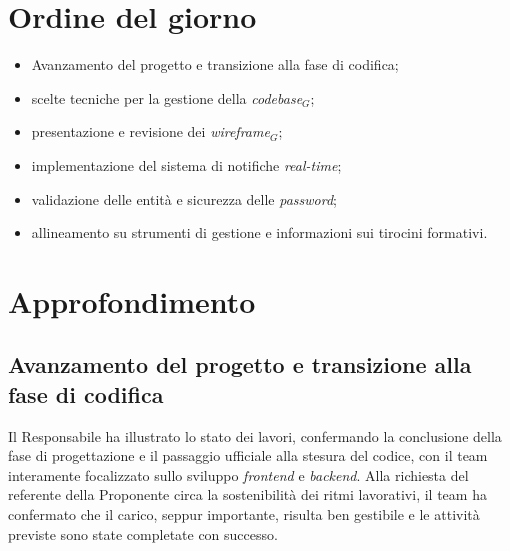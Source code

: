 \documentclass[10pt, letterpaper]{article}
\begin{document}
\makeTitlePage

\newpage

\tableofcontents

\newpage


\makeMeetingParticipantsTable

\section{Ordine del giorno}
\begin{itemize}
      \item Avanzamento del progetto e transizione alla fase di codifica;
      \item scelte tecniche per la gestione della \textit{codebase$_G$};
      \item presentazione e revisione dei \textit{wireframe$_G$};
      \item implementazione del sistema di notifiche \textit{real-time};
      \item validazione delle entità e sicurezza delle \textit{password};
      \item allineamento su strumenti di gestione e informazioni sui tirocini formativi.
\end{itemize}

\section{Approfondimento}

\subsection*{Avanzamento del progetto e transizione alla fase di codifica}
Il Responsabile ha illustrato lo stato dei lavori, confermando la conclusione della fase di progettazione e il
passaggio ufficiale alla stesura del codice, con il team interamente focalizzato sullo sviluppo \textit{frontend}
e \textit{backend}. Alla richiesta del referente della Proponente circa la sostenibilità dei ritmi lavorativi, il
team ha confermato che il carico, seppur importante, risulta ben gestibile e le attività previste sono state completate
con successo.
\end{document}
